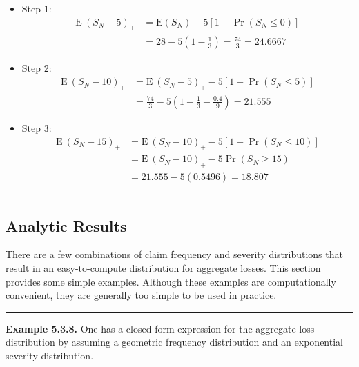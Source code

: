 \documentclass[]{book}
\theoremstyle{definition}
\theoremstyle{definition}
\theoremstyle{definition}
\theoremstyle{remark}
\begin{document}
\begin{itemize}
\item
  Step 1:\\
  \[\begin{aligned}
  \mathrm{E~}(S_N-5)_+ &= \mathrm{E}(S_N) - 5 [1-\Pr(S_N \leq 0) ]\\ %
  &= 28 - 5 \left(1 - \frac{1}{3}\right) = \frac{74}{3}=24.6667
  \end{aligned}\]
\item
  Step 2:\\
  \[\begin{aligned}
  \mathrm{E~}(S_N-10)_+ &= \mathrm{E~}(S_N-5)_+ - 5 [1-\Pr(S_N \leq 5)]\\ %
  &= \frac{74}{3} - 5\left( 1 - \frac{1}{3} - \frac{0.4}{9}\right) = 21.555
  \end{aligned}\]
\item
  Step 3: \[\begin{aligned}
  \mathrm{E~}(S_N-15)_+ &= \mathrm{E~}(S_N-10)_+ - 5 [1-\Pr(S_N \leq 10)] \\ %
  &= \mathrm{E~}(S_N-10)_+ - 5\Pr (S_N\ge 15) \\
  &= 21.555 - 5 (0.5496) = 18.807
  \end{aligned}\]
\end{itemize}

\begin{center}\rule{0.5\linewidth}{\linethickness}\end{center}

\subsection{Analytic Results}\label{analytic-results}

There are a few combinations of claim frequency and severity
distributions that result in an easy-to-compute distribution for
aggregate losses. This section provides some simple examples. Although
these examples are computationally convenient, they are generally too
simple to be used in practice.

\begin{center}\rule{0.5\linewidth}{\linethickness}\end{center}

\textbf{Example 5.3.8.} One has a closed-form expression for the
aggregate loss distribution by assuming a geometric frequency
distribution and an exponential severity distribution.
\end{document}
